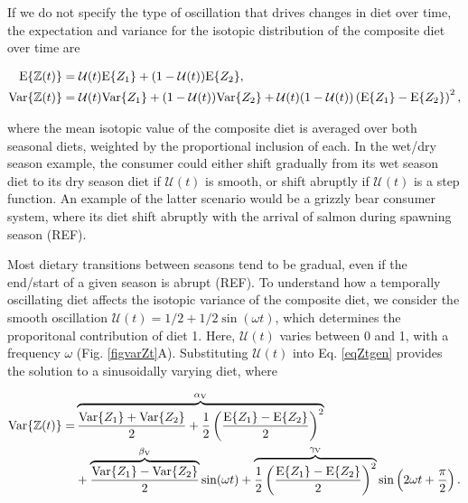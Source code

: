 \documentclass{frontiersSCNS}
\begin{document}

If we do not specify the type of oscillation that drives changes in diet over time, the expectation and variance for the isotopic distribution of the composite diet over time are

\begin{align}
  \label{eqZtgen}
  \begin{split}
    {\rm E}\{\mathbb{Z}(t)\} &= \mathcal{U}(t){\rm E}\{Z_1\} + (1-\mathcal{U}(t)){\rm E}\{Z_2\}, \\
    {\rm Var}\{\mathbb{Z}(t)\} &= \mathcal{U}(t){\rm Var}\{Z_1\} + (1-\mathcal{U}(t)){\rm Var}\{Z_2\} + \mathcal{U}(t)(1-\mathcal{U}(t))\left({\rm E}\{Z_1\} - {\rm E}\{Z_2\}\right)^2,
  \end{split}
\end{align}

\noindent where the mean isotopic value of the composite diet is averaged over both seasonal diets, weighted by the proportional inclusion of each.
In the wet/dry season example, the consumer could either shift gradually from its wet season diet to its dry season diet if $\mathcal{U}(t)$ is smooth, or shift abruptly if $\mathcal{U}(t)$ is a step function.
An example of the latter scenario would be a grizzly bear consumer system, where its diet shift abruptly with the arrival of salmon during spawning season (REF).


Most dietary transitions between seasons tend to be gradual, even if the end/start of a given season is abrupt (REF).
To understand how a temporally oscillating diet affects the isotopic variance of the composite diet, we consider the smooth oscillation $\mathcal{U}(t) = 1/2 + 1/2\sin(\omega t)$, which determines the proporitonal contribution of diet 1.
Here, $\mathcal{U}(t)$ varies between 0 and 1, with a frequency $\omega$ (Fig. \ref{figvarZt}A).
Substituting $\mathcal{U}(t)$ into Eq. \ref{eqZtgen} provides the solution to a sinusoidally varying diet, where

\begin{align}
  \begin{split}
  \label{eqZtsin}
    {\rm Var}\{\mathbb{Z}(t)\} = &\overbrace{\frac{{\rm Var}\{Z_1\} + {\rm Var}\{Z_2\}}{2} + \frac{1}{2} \left(\frac{{\rm E}\{Z_1\} - {\rm E}\{Z_2\}}{2}\right)^2}^{\alpha_{\rm V}} \\
    &+ \overbrace{\frac{{\rm Var}\{Z_1\} - {\rm Var}\{Z_2\}}{2}}^{\beta_{\rm V}}\sin(\omega t) + \overbrace{\frac{1}{2}\left(\frac{{\rm E}\{Z_1\} - {\rm E}\{Z_2\}}{2}\right)^2}^{\gamma_{\rm V}}\sin\left(2\omega t + \frac{\pi}{2}\right).
  \end{split}
\end{align}
\end{document}
